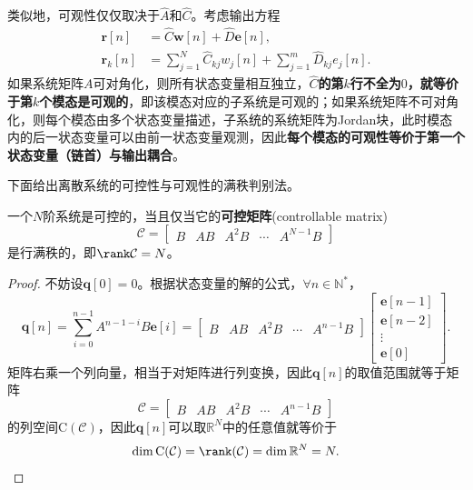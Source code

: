 类似地，可观性仅仅取决于$\hat{A}$和$\hat{C}$。考虑输出方程
\begin{equation}
    \begin{aligned}
        \mathbf{r}[n]&=\hat{C}\mathbf{w}[n]+\hat{D}\mathbf{e}[n], \\
        \mathbf{r}_k[n]&=\sum_{j=1}^{N}\hat{C}_{kj}w_j[n]+\sum_{j=1}^{m}\hat{D}_{kj}e_j[n].
    \end{aligned}
\end{equation}
如果系统矩阵$A$可对角化，则所有状态变量相互独立，\textbf{$\hat{C}$的第$k$行不全为$0$，就等价于第$k$个模态是可观的}，即该模态对应的子系统是可观的；如果系统矩阵不可对角化，则每个模态由多个状态变量描述，子系统的系统矩阵为Jordan块，此时模态内的后一状态变量可以由前一状态变量观测，因此\textbf{每个模态的可观性等价于第一个状态变量（链首）与输出耦合}。

下面给出离散系统的可控性与可观性的满秩判别法。

\begin{theorem}[可控性的满秩判别法]
    一个$N$阶系统是可控的，当且仅当它的\textbf{可控矩阵}(controllable matrix)
    \begin{equation}
        \mathcal{C}=\begin{bmatrix}
            B & AB & A^2B & \cdots & A^{N-1}B
        \end{bmatrix}
    \end{equation}
    是行满秩的，即$\rank\mathcal{C}=N$。
\end{theorem}
\begin{proof}
    不妨设$\mathbf{q}[0]=0$。根据状态变量的解的公式，$\forall n\in\mathbb{N}^*$，
    \begin{equation}
        \mathbf{q}[n]=\sum_{i=0}^{n-1}A^{n-1-i}B\mathbf{e}[i]=\begin{bmatrix}
            B & AB & A^2B & \cdots & A^{n-1}B
        \end{bmatrix}\begin{bmatrix}
            \mathbf e[n-1]\\
            \mathbf e[n-2] \\
            \vdots \\
            \mathbf e[0]
        \end{bmatrix}.
    \end{equation}
    矩阵右乘一个列向量，相当于对矩阵进行列变换，因此$\mathbf{q}[n]$的取值范围就等于矩阵
    \begin{equation}
        \mathcal{C}=\begin{bmatrix}
            B & AB & A^2B & \cdots & A^{n-1}B
        \end{bmatrix}
    \end{equation}
    的列空间$\mathrm{C}(\mathcal{C})$，因此$\mathbf{q}[n]$可以取$\mathbb{R}^N$中的任意值就等价于
    \begin{equation}
        \dim\mathrm{C}(\mathcal{C})=\rank(\mathcal{C})=\dim\mathbb{R}^N=N.
    \end{equation}
\end{proof}


